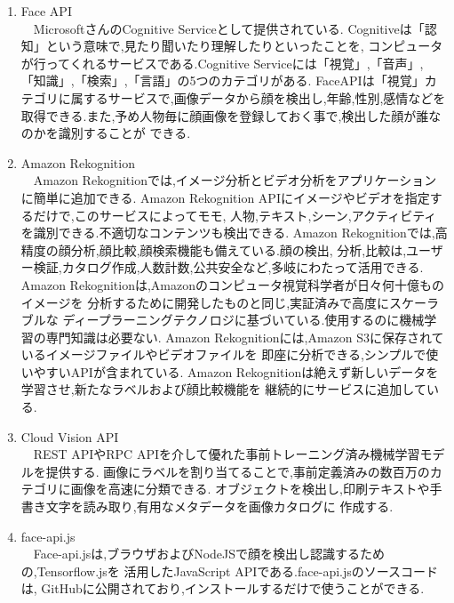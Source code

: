 \renewcommand{\labelenumi}{(\arabic{enumi})}

\begin{enumerate}
  \item Face API \\
  　MicrosoftさんのCognitive Serviceとして提供されている.
  Cognitiveは「認知」という意味で,見たり聞いたり理解したりといったことを,
  コンピュータが行ってくれるサービスである.Cognitive Serviceには「視覚」,「音声」,
  「知識」,「検索」,「言語」の5つのカテゴリがある.
  FaceAPIは「視覚」カテゴリに属するサービスで,画像データから顔を検出し,年齢,性別,感情などを
  取得できる.また,予め人物毎に顔画像を登録しておく事で,検出した顔が誰なのかを識別することが
  できる.\\

  \item Amazon Rekognition \\
  　Amazon Rekognitionでは,イメージ分析とビデオ分析をアプリケーションに簡単に追加できる.
  Amazon Rekognition APIにイメージやビデオを指定するだけで,このサービスによってモモ,
  人物,テキスト,シーン,アクティビティを識別できる.不適切なコンテンツも検出できる.
  Amazon Rekognitionでは,高精度の顔分析,顔比較,顔検索機能も備えている.顔の検出,
  分析,比較は,ユーザー検証,カタログ作成,人数計数,公共安全など,多岐にわたって活用できる.
  Amazon Rekognitionは,Amazonのコンピュータ視覚科学者が日々何十億ものイメージを
  分析するために開発したものと同じ,実証済みで高度にスケーラブルな
  ディープラーニングテクノロジに基づいている.使用するのに機械学習の専門知識は必要ない.
  Amazon Rekognitionには,Amazon S3に保存されているイメージファイルやビデオファイルを
  即座に分析できる,シンプルで使いやすいAPIが含まれている.
  Amazon Rekognitionは絶えず新しいデータを学習させ,新たなラベルおよび顔比較機能を
  継続的にサービスに追加している.\\

  \item Cloud Vision API  \\
  　REST APIやRPC APIを介して優れた事前トレーニング済み機械学習モデルを提供する.
  画像にラベルを割り当てることで,事前定義済みの数百万のカテゴリに画像を高速に分類できる.
  オブジェクトを検出し,印刷テキストや手書き文字を読み取り,有用なメタデータを画像カタログに
  作成する.\\

  \item face-api.js \\
  　Face-api.jsは,ブラウザおよびNodeJSで顔を検出し認識するための,Tensorflow.jsを
  活用したJavaScript APIである.face-api.jsのソースコードは,
  GitHubに公開されており,インストールするだけで使うことができる.
  
\end{enumerate}


